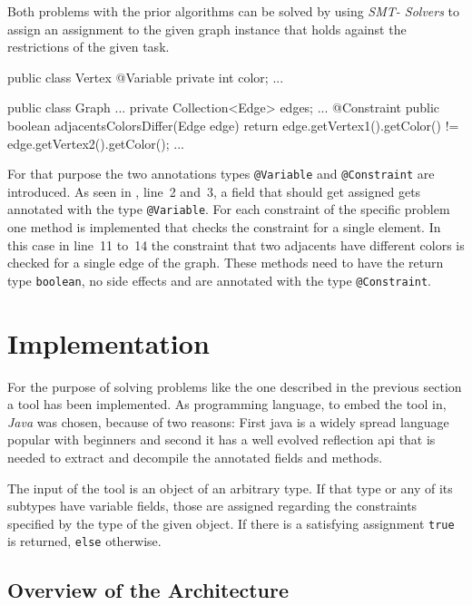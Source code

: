 \documentclass[conference]{IEEEtran}
\begin{document}
Both problems with the prior algorithms can be solved by using \emph{SMT-%
Solvers} to assign an assignment to the given graph instance that holds against
the restrictions of the given task.

\begin{javalst}[label=lst:graph_coloring_extended,caption=Graph-coloring
  example with annotations and constraints]
public class Vertex {
  @Variable
  private int color;
  ...
}

public class Graph {
  ...
  private Collection<Edge> edges;
  ...
  @Constraint
  public boolean adjacentsColorsDiffer(Edge edge) {
    return edge.getVertex1().getColor() != edge.getVertex2().getColor();
  }
  ...
}
\end{javalst}

For that purpose the two annotations types \texttt{@Variable} and
\texttt{@Constraint} are introduced. As seen in
, line~2 and~3, a field that should get
assigned gets annotated with the type \texttt{@Variable}. For each constraint
of the specific problem one method is implemented that checks the constraint
for a single element. In this case in line~11 to~14 the constraint that two
adjacents have different colors is checked for a single edge of the graph.
These methods need to have the return type \texttt{boolean}, no side effects
and are annotated with the type \texttt{@Constraint}.

\section{Implementation}
\label{sec:implementation}

For the purpose of solving problems like the one described in the previous
section a tool has been implemented. As programming language, to embed the tool
in, \emph{Java} was chosen, because of two reasons: First java is a widely
spread language popular with beginners and second it has a well evolved
reflection api that is needed to extract and decompile the annotated fields and
methods.

The input of the tool is an object of an arbitrary type. If that type or any of
its subtypes have variable fields, those are assigned regarding the constraints
specified by the type of the given object. If there is a satisfying assignment
\texttt{true} is returned, \texttt{else} otherwise.

\subsection{Overview of the Architecture}
\label{sec:impl_overv-arch}
\end{document}
